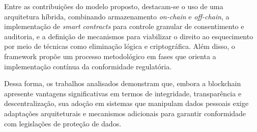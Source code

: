 Entre as contribuições do modelo proposto, destacam-se o uso de uma arquitetura híbrida, combinando armazenamento \textit{on-chain} e \textit{off-chain}, a implementação de \textit{smart contracts} para controle granular de consentimento e auditoria, e a definição de mecanismos para viabilizar o direito ao esquecimento por meio de técnicas como eliminação lógica e criptográfica. Além disso, o framework propõe um processo metodológico em fases que orienta a implementação contínua da conformidade regulatória.

Dessa forma, os trabalhos analisados demonstram que, embora a blockchain apresente vantagens significativas em termos de integridade, transparência e descentralização, sua adoção em sistemas que manipulam dados pessoais exige adaptações arquiteturais e mecanismos adicionais para garantir conformidade com legislações de proteção de dados.
